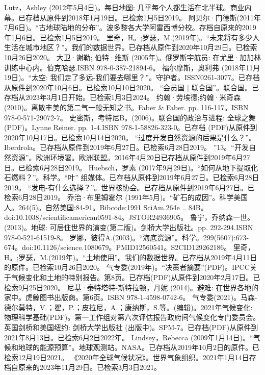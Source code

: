 \begin{enumerate}
 Lutz，Ashley (2012年5月4日)。每日地图: 几乎每个人都生活在北半球。商业内幕。已存档从原件到2018年1月19日。已检索1月5日2019。
 阿贝尔·门德斯(2011年7月6日)。“古地球陆地的分布”。波多黎各大学阿雷西博分校。存档自原来的2019年1月6日。已检索1月5日2019。
 里奇，H。;罗瑟，M.(2019年)。“未来将有多少人生活在城市地区？”。我们的数据世界。已存档从原件到2020年10月29日。已检索10月26日2020。
 大卫·谢勒; 伯特·维斯 (2005年)。俄罗斯宇航员: 在尤里·加加林训练中心内。伯克哈瑟.ISBN 978-0-387-21894-6。
 福尔摩斯，奥利弗 (2018年11月19日)。“太空: 我们走了多远-我们要去哪里？”。守护者。ISSN0261-3077。已存档从原件到2020年10月6日。已检索10月10日2020。 
 “会员国 | 联合国”。联合国。已存档从2023年3月1日开始。已检索1月3日2024。
 约翰·劳埃德;约翰·米奇森(2010)。离散丰美的第二气一般无知之书。Faber & Faber. pp. 116-117。ISBN 978-0-571-29072-7。
 史密斯，考特尼B。(2006)。联合国的政治与进程: 全球之舞(PDF)。Lynne Reiner. pp. 1-4.ISBN  978-1-58826-323-0。已存档 (PDF)从原件到2020年10月17日。已检索10月14日2020。
 “过度开发自然资源的后果是什么？”。Iberdrola。已存档从原件到2019年6月27日。已检索6月28日2019。
 ”13。“开发自然资源”。欧洲环境署。欧洲联盟。2016年4月20日已存档从原件到2019年6月27日。已检索6月28日2019。
 Huebsch，罗素 (2017年9月29日)。“如何从地下提取化石燃料？”。科学。“叶” 组媒体。已存档从原件到2019年6月27日。已检索6月28日2019。
 “发电-有什么选择？”。世界核协会。已存档从原件到2019年6月27日。已检索6月28日2019。
 乔治·布里姆霍尔 (1991年5月)。“矿石的成因”。科学美国人。264(5)。自然美国:84-91。Bibcode:1991 SciAm.264e .. 84B。doi:10.1038/scientificamerican0591-84。JSTOR24936905。 
 鲁宁，乔纳森一世。(2013)。地球: 可居住世界的演变(第二版)。剑桥大学出版社。pp. 292-294.ISBN 978-0-521-61519-8。
 罗娜，彼得A.(2003)。“海底资源”。科学。299(5607):673-674。doi:10.1126/science.1080679。PMID12560541。S2CID129262186。  
 里奇，H。;罗瑟，M.(2019年)。“土地使用”。我们的数据世界。已存档从2019年4月11日的原件。已检索10月26日2020。
 气专委(2019年)。“决策者摘要”(PDF)。IPCC关于气候变化和土地的特别报告。第8页。已存档(PDF)从原件到2020年2月17日。已检索9月25日2020。
 尼基·泰特塔特-斯特拉顿，丹妮 (2014)。避难: 在世界各地的家中。虎鲸图书出版商。第6页。ISBN 978-1-4598-0742-6。
 气专委(2021)。马森-德尔莫特，V.；翟，P.；皮拉尼，A.；康纳斯，S.等。(编辑)。2021年气候变化: 物理科学基础(PDF)。第一工作组对第六次评估报告政府间气候变化专门委员会。英国剑桥和美国纽约: 剑桥大学出版社 (出版中)。SPM-7。已存档(PDF)从原件到2021年8月13日。已检索6月2日2022年。
 Lindsey，Rebecca (2009年1月14日)。“气候和地球的能源预算”。地球观测站。NASA。已存档从2019年10月2日的原件。已检索12月19日2021。
 《2020年全球气候状况》。世界气象组织。2021年1月14日存档自原来的2023年11月29日。已检索3月3日2021。

\end{enumerate}
